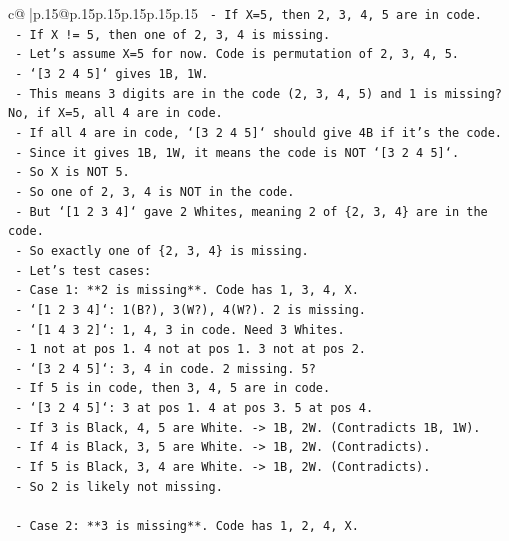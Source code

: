\documentclass{article}
\begin{document}
{\begin{supertabular}{c@{$\;$}|p{.15\linewidth}@{}p{.15\linewidth}p{.15\linewidth}p{.15\linewidth}p{.15\linewidth}p{.15\linewidth}}
{{{\texttt{  {-} If X=5, then 2, 3, 4, 5 are in code.} \\
\texttt{  {-} If X != 5, then one of 2, 3, 4 is missing.} \\
\texttt{  {-} Let's assume X=5 for now. Code is permutation of 2, 3, 4, 5.} \\
\texttt{  {-} `{[}3 2 4 5{]}` gives 1B, 1W.} \\
\texttt{  {-} This means 3 digits are in the code (2, 3, 4, 5) and 1 is missing? No, if X=5, all 4 are in code.} \\
\texttt{  {-} If all 4 are in code, `{[}3 2 4 5{]}` should give 4B if it's the code.} \\
\texttt{  {-} Since it gives 1B, 1W, it means the code is NOT `{[}3 2 4 5{]}`.} \\
\texttt{  {-} So X is NOT 5.} \\
\texttt{  {-} So one of 2, 3, 4 is NOT in the code.} \\
\texttt{  {-} But `{[}1 2 3 4{]}` gave 2 Whites, meaning 2 of \{2, 3, 4\} are in the code.} \\
\texttt{  {-} So exactly one of \{2, 3, 4\} is missing.} \\
\texttt{  {-} Let's test cases:} \\
\texttt{    {-} Case 1: **2 is missing**. Code has 1, 3, 4, X.} \\
\texttt{      {-} `{[}1 2 3 4{]}`: 1(B?), 3(W?), 4(W?). 2 is missing.} \\
\texttt{      {-} `{[}1 4 3 2{]}`: 1, 4, 3 in code. Need 3 Whites.} \\
\texttt{        {-} 1 not at pos 1. 4 not at pos 1. 3 not at pos 2.} \\
\texttt{      {-} `{[}3 2 4 5{]}`: 3, 4 in code. 2 missing. 5?} \\
\texttt{        {-} If 5 is in code, then 3, 4, 5 are in code.} \\
\texttt{        {-} `{[}3 2 4 5{]}`: 3 at pos 1. 4 at pos 3. 5 at pos 4.} \\
\texttt{        {-} If 3 is Black, 4, 5 are White. {-}> 1B, 2W. (Contradicts 1B, 1W).} \\
\texttt{        {-} If 4 is Black, 3, 5 are White. {-}> 1B, 2W. (Contradicts).} \\
\texttt{        {-} If 5 is Black, 3, 4 are White. {-}> 1B, 2W. (Contradicts).} \\
\texttt{      {-} So 2 is likely not missing.} \\
\\ 
\texttt{    {-} Case 2: **3 is missing**. Code has 1, 2, 4, X.} \\
}}}
\end{supertabular}}
\end{document}
